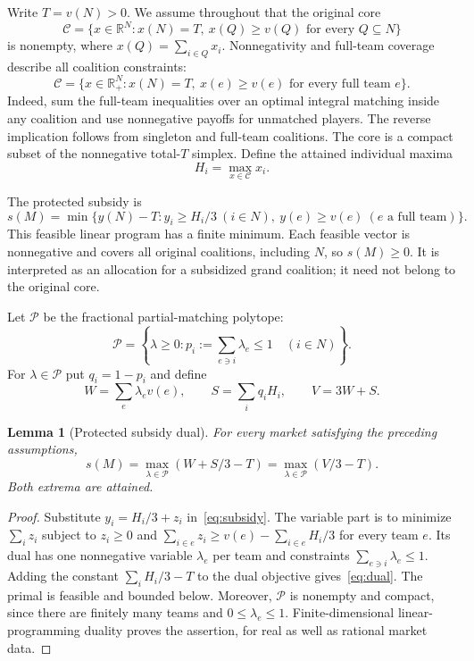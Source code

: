 \documentclass[11pt]{article}
\newtheorem{lemma}[theorem]{Lemma}
\theoremstyle{remark}
\newcommand{\R}{\mathbb R}
\newcommand{\core}{\mathcal C}
\newcommand{\pack}{\mathcal P}
\begin{document}
Write $T=v(N)>0$. We assume throughout that the original core
\[
 \core=\{x\in\R^N:x(N)=T,\ x(Q)\ge v(Q)\text{ for every }Q\subseteq N\}
\]
is nonempty, where $x(Q)=\sum_{i\in Q}x_i$.
Nonnegativity and full-team coverage describe all coalition constraints:
\begin{equation}\label{eq:core}
 \core=\{x\in\R_+^N:x(N)=T,\ x(e)\ge v(e)\text{ for every full team }e\}.
\end{equation}
Indeed, sum the full-team inequalities over an optimal integral matching
inside any coalition and use nonnegative payoffs for unmatched players.
The reverse implication follows from singleton and full-team coalitions.
The core is a compact subset of the nonnegative total-$T$ simplex. Define
the attained individual maxima
\begin{equation}\label{eq:ideals}
                        H_i=\max_{x\in\core}x_i.
\end{equation}

The protected subsidy is
\begin{equation}\label{eq:subsidy}
 s(M)=\min\{y(N)-T:y_i\ge H_i/3\ (i\in N),\
                         y(e)\ge v(e)\ (e\text{ a full team})\}.
\end{equation}
This feasible linear program has a finite minimum. Each feasible vector
is nonnegative and covers all original coalitions, including $N$, so
$s(M)\ge0$. It is interpreted as an allocation for a subsidized grand
coalition; it need not belong to the original core.

Let $\pack$ be the fractional partial-matching polytope:
\[
 \pack=\left\{\lambda\ge0:
               p_i:=\sum_{e\ni i}\lambda_e\le1\quad(i\in N)\right\}.
\]
For $\lambda\in\pack$ put $q_i=1-p_i$ and define
\begin{equation}\label{eq:dualquantities}
 W=\sum_e\lambda_e v(e),\qquad
 S=\sum_iq_iH_i,\qquad V=3W+S.
\end{equation}

\begin{lemma}[Protected subsidy dual]\label{lem:dual}
For every market satisfying the preceding assumptions,
\begin{equation}\label{eq:dual}
                  s(M)=\max_{\lambda\in\pack}(W+S/3-T)
                       =\max_{\lambda\in\pack}(V/3-T).
\end{equation}
Both extrema are attained.
\end{lemma}
\begin{proof}
Substitute $y_i=H_i/3+z_i$ in~\eqref{eq:subsidy}. The variable part is
to minimize $\sum_i z_i$ subject to $z_i\ge0$ and
$\sum_{i\in e}z_i\ge v(e)-\sum_{i\in e}H_i/3$ for every team $e$.
Its dual has one nonnegative variable $\lambda_e$ per team and constraints
$\sum_{e\ni i}\lambda_e\le1$. Adding the constant
$\sum_iH_i/3-T$ to the dual objective gives~\eqref{eq:dual}.
The primal is feasible and bounded below. Moreover, $\pack$ is nonempty
and compact, since there are finitely many teams and $0\le\lambda_e\le1$.
Finite-dimensional linear-programming duality proves the assertion, for
real as well as rational market data.
\end{proof}
\end{document}
